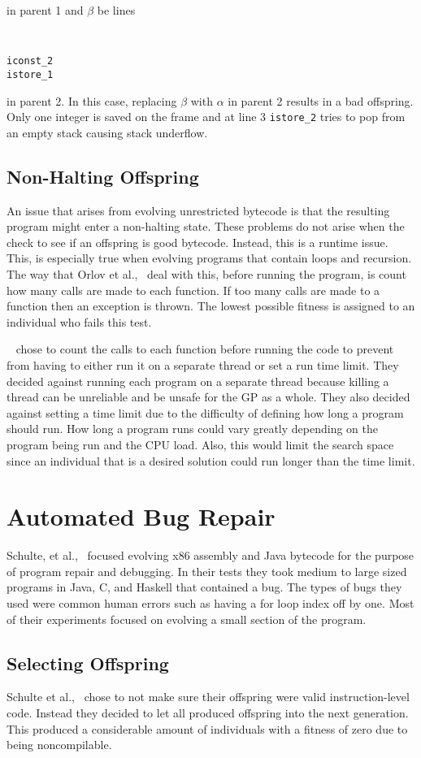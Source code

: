\documentclass{sig-alternate}
\begin{document}
in parent 1 and $\beta$ be lines 
{\tt
\begin{verbatim}
iconst_2
istore_1
\end{verbatim}}
in parent 2. In this case, replacing $\beta$ with $\alpha$ in parent 2 results in a bad offspring. Only one integer is saved on the frame and at line 3 \texttt{istore\_2} tries to pop from an empty stack causing stack underflow.

\subsection{Non-Halting Offspring}
An issue that arises from evolving unrestricted bytecode is that the resulting program might enter a non-halting state. These problems do not arise when the check to see if an offspring is good bytecode. Instead, this is a runtime issue. This, is especially true when evolving programs that contain loops and recursion.
The way that Orlov et al.,~\cite{FINCH:2011} deal with this, before running the program, is count how many calls are made to each function. If too many calls are made to a function then an exception is thrown. The lowest possible fitness is assigned to an individual who fails this test.

~\cite{FINCH:2011} chose to count the calls to each function before running the code to prevent from having to either run it on a separate thread or set a run time limit. They decided against running each program on a separate thread because killing a thread can be unreliable and be unsafe for the GP as a whole. They also decided against setting a time limit due to the difficulty of defining how long a program should run. How long a program runs could vary greatly depending on the program being run and the CPU load. Also, this would limit the search space since an individual that is a desired solution could run longer than the time limit.


\section{Automated Bug Repair}
Schulte, et al.,~\cite{Assembly:2010} focused evolving x86 assembly and Java bytecode for the purpose of program repair and debugging. In their tests they took medium to large sized programs in Java, C, and Haskell that contained a bug. The types of bugs they used were common human errors such as having a for loop index off by one. Most of their experiments focused on evolving a small section of the program. 
\subsection{Selecting Offspring } 
Schulte et al.,~\cite{Assembly:2010} chose to not make sure their offspring were valid instruction-level code. Instead they decided to let all produced offspring into the next generation. This produced a considerable amount of individuals with a fitness of zero due to being noncompilable.
\end{document}
